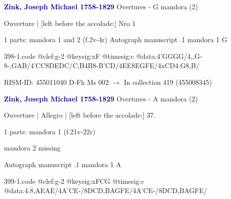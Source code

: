 \documentclass[twocolumn]{book}
\begin{document}
\newline \par \vspace{7pt} \textcolor{darkblue}{\textbf{Zink, Joseph Michael  1758-1829}}
\newline Overtures - G
\newline mandora (2)
\newline \begin{itshape} Ouverture | [left before the accolade:] Nro 1\end{itshape} 
\newline \textcolor{darkblue}{}  1 parts: mandora 1 and 2  (f.2v-4r)
\newline Autograph manuscript
.1  mandora 1  G  
\begin{filecontents*}{398-1.code}
@clef:g-2
@keysig:xF
@timesig:c
@data:4'GGGG/4,,G-8-{,GAB}/4'CC8DEDC/{C,B}4B8-{B'C}D/4EE{8EG}{FE}/4xCD4.G8,B/
\end{filecontents*}
\newline
%

\newline RISM-ID: 455011040
\newline D-Fh  Ms 002
\newline $\rightarrow$ In collection 419 (455008345)
      
\newline \par \vspace{7pt} \textcolor{darkblue}{\textbf{Zink, Joseph Michael  1758-1829}}
\newline Overtures - A
\newline mandora (2)
\newline \begin{itshape}[f.21v, at left:] Ouverture | Allegro | [left before the accolade:] 37.\end{itshape} 
\newline \textcolor{darkblue}{}  1 parts: mandora 1  (f.21v-22r)
\newline \begin{small} mandora 2 missing\end{small} 
\newline Autograph manuscript
.1  mandora 1  A  
\begin{filecontents*}{399-1.code}
@clef:g-2
@keysig:xFCG
@timesig:c
@data:4.8,AEAE/4A'CE-/{8DC}{D,B}{AG}{FE}/4A'CE-/{8DC}{D,B}{AG}{FE}/
\end{filecontents*}
\newline
%
\end{document}
